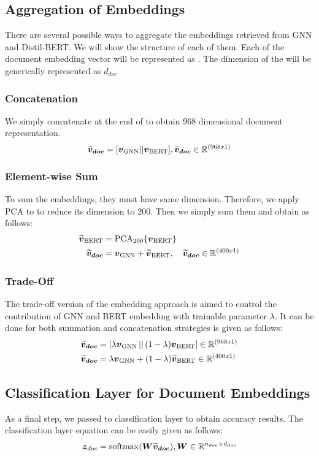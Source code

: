 \subsection{Aggregation of Embeddings}\label{aggregation}
There are several possible ways to aggregate the embeddings retrieved from GNN and Distil-BERT. We will show the structure of each of them. Each of the document embedding vector will be represented as \DOCEM{}. The dimension of the \DOCEM{} will be generically represented as $d_{doc}$
\subsubsection{Concatenation}\label{agg:concat}
We simply concatenate \BERTEM{} at the end of \GNNEM{} to obtain 968 dimensional document representation.
\begin{equation}
    \boldsymbol{\widetilde{v}_{doc}} = [\boldsymbol{v}_{\text{GNN}} || \boldsymbol{v}_{\text{BERT}}], \boldsymbol{\widetilde{v}_{doc}} \in \mathbb{R}^{(968x1)}
\end{equation}
\subsubsection{Element-wise Sum}\label{agg:sum}
To sum the embeddings, they must have same dimension. Therefore, we apply PCA to \BERTEM{} to reduce its dimension to 200. Then we simply sum them and obtain \DOCEM{} as follows:
\begin{align}
    \boldsymbol{\widetilde{v}}_{\text{BERT}} & = \operatorname{PCA}_{200}\{\boldsymbol{v}_{\text{BERT}}\} \\
    \boldsymbol{\widetilde{v}_{doc}} & = \boldsymbol{v}_{\text{GNN}} + \boldsymbol{\widetilde{v}}_{\text{BERT}},\quad \boldsymbol{\widetilde{v}_{doc}} \in \mathbb{R}^{(400x1)}
\end{align}

\subsubsection{Trade-Off}\label{agg:trade-off}
The trade-off version of the embedding approach is aimed to control the contribution of GNN and BERT embedding with trainable parameter $\lambda$. It can be done for both summation and concatenation strategies \DOCEM{} is given as follows:
\begin{align}
    \boldsymbol{\widetilde{v}_{doc}} & = [\lambda\boldsymbol{v}_{\text{GNN}}{}\, ||\, (1-\lambda)\boldsymbol{v}_{\text{BERT}}{}] \in \mathbb{R}^{(968x1)} \\
    \boldsymbol{\widetilde{v}_{doc}} & = \lambda\boldsymbol{v}_{\text{GNN}}{} + (1-\lambda)\boldsymbol{\widetilde{v}}_{\text{BERT}}{} \in \mathbb{R}^{(400x1)} 
\end{align}

\subsection{Classification Layer for Document Embeddings}
As a final step, we passed \DOCEM{} to  classification layer to obtain accuracy results. The classification layer equation can be easily given as follows:
\begin{equation}
    \boldsymbol{z}_{doc} = \operatorname{softmax}(\boldsymbol{W}\boldsymbol{\widetilde{v}_{doc}}), \boldsymbol{W} \in \mathbb{R}^{n_{doc} \times d_{doc} }
\end{equation}